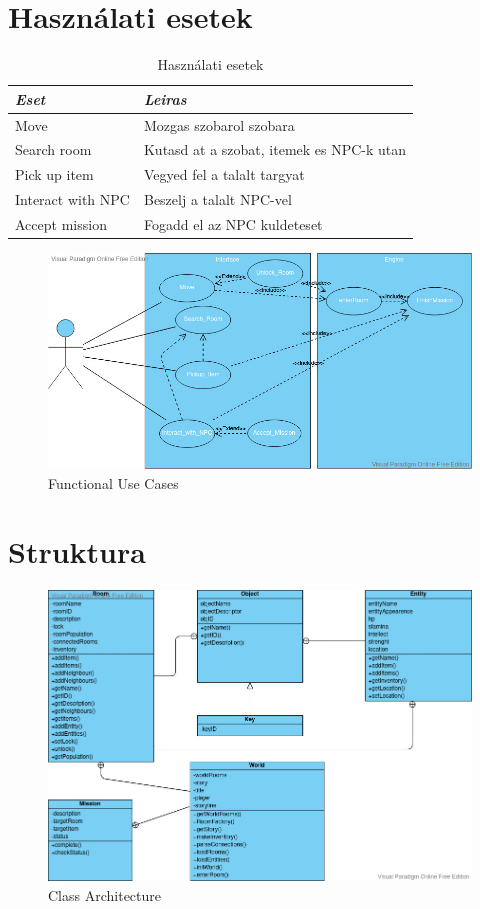 \documentclass{scrarticle}
\begin{document}
\section{Használati esetek}
\begin{table}[H] \centering
    \caption{Használati esetek}\label{tab:usecasetable}
    \begin{tabular}{@{}ll@{}}
        \emph{Eset} & \emph{Leiras}\\ \hline
        Move         & Mozgas szobarol szobara\\
        Search room  & Kutasd at a szobat, itemek es NPC-k utan\\
        Pick up item & Vegyed fel a talalt targyat\\
        Interact with NPC & Beszelj a talalt NPC-vel\\
        Accept mission & Fogadd el az NPC kuldeteset
    \end{tabular}
\end{table}

\graphicspath{{../Planning/}}
\begin{figure}[H]\centering
    \includegraphics[width=1.0\columnwidth]{Functional_UseCase.jpg}
    \caption{Functional Use Cases}\label{fig:1}
\end{figure}

\section{Struktura}
\begin{figure}[H]
    \includegraphics[width=0.75\columnwidth]{Class_Architecture.jpg}
    \caption{Class Architecture}\label{fig:2}
\end{figure}
\end{document}
